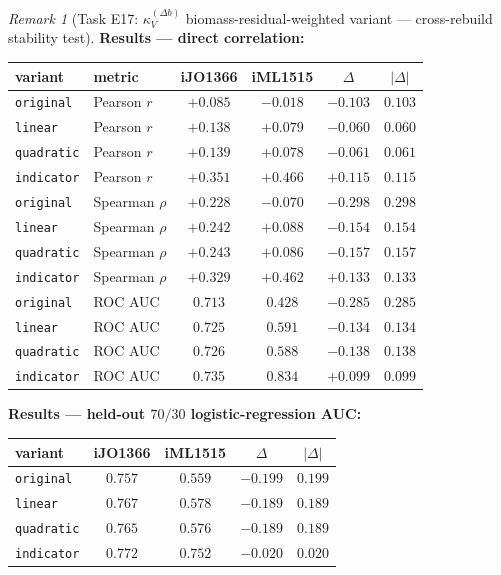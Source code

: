 \documentclass[11pt,a4paper]{article}
\theoremstyle{plain}
\theoremstyle{definition}
\theoremstyle{remark}
\newtheorem{remark}[theorem]{Remark}
\begin{document}
\begin{remark}[Task E17: $\kappa_V^{(\Delta b)}$ biomass-residual-weighted
variant --- cross-rebuild stability test]
\textbf{Results --- direct correlation:}
\begin{center}
\begin{tabular}{llcccc}
\hline
variant & metric & iJO1366 & iML1515 & $\Delta$ & $|\Delta|$ \\
\hline
\texttt{original}    & Pearson $r$    & $+0.085$ & $-0.018$ & $-0.103$ & $0.103$ \\
\texttt{linear}      & Pearson $r$    & $+0.138$ & $+0.079$ & $-0.060$ & $\mathbf{0.060}$ \\
\texttt{quadratic}   & Pearson $r$    & $+0.139$ & $+0.078$ & $-0.061$ & $0.061$ \\
\texttt{indicator}   & Pearson $r$    & $+0.351$ & $+0.466$ & $+0.115$ & $0.115$ \\
\hline
\texttt{original}    & Spearman $\rho$ & $+0.228$ & $-0.070$ & $-0.298$ & $0.298$ \\
\texttt{linear}      & Spearman $\rho$ & $+0.242$ & $+0.088$ & $-0.154$ & $0.154$ \\
\texttt{quadratic}   & Spearman $\rho$ & $+0.243$ & $+0.086$ & $-0.157$ & $0.157$ \\
\texttt{indicator}   & Spearman $\rho$ & $+0.329$ & $+0.462$ & $+0.133$ & $\mathbf{0.133}$ \\
\hline
\texttt{original}    & ROC AUC         & $0.713$  & $0.428$  & $-0.285$ & $0.285$ \\
\texttt{linear}      & ROC AUC         & $0.725$  & $0.591$  & $-0.134$ & $0.134$ \\
\texttt{quadratic}   & ROC AUC         & $0.726$  & $0.588$  & $-0.138$ & $0.138$ \\
\texttt{indicator}   & ROC AUC         & $0.735$  & $0.834$  & $+0.099$ & $\mathbf{0.099}$ \\
\hline
\end{tabular}
\end{center}

\textbf{Results --- held-out $70/30$ logistic-regression AUC:}
\begin{center}
\begin{tabular}{lcccc}
\hline
variant & iJO1366 & iML1515 & $\Delta$ & $|\Delta|$ \\
\hline
\texttt{original}    & $0.757$ & $0.559$ & $-0.199$ & $0.199$ \\
\texttt{linear}      & $0.767$ & $0.578$ & $-0.189$ & $0.189$ \\
\texttt{quadratic}   & $0.765$ & $0.576$ & $-0.189$ & $0.189$ \\
\texttt{indicator}   & $0.772$ & $0.752$ & $-0.020$ & $\mathbf{0.020}$ \\
\hline
\end{tabular}
\end{center}


\end{remark}
\end{document}
